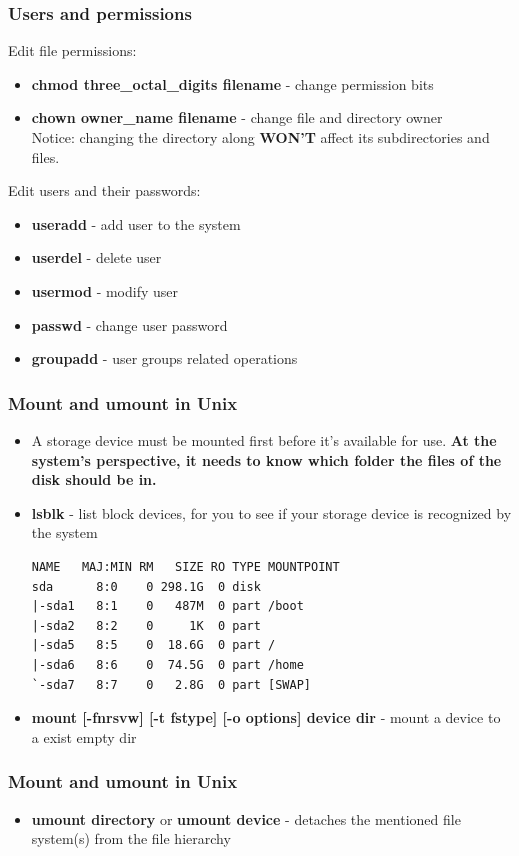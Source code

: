 \documentclass[11pt]{beamer}
\begin{document}
\begin{frame}
\frametitle{Users and permissions}
Edit file permissions:
\begin{itemize}
\item \textbf{chmod three\_octal\_digits filename} - change permission bits
\item \textbf{chown owner\_name filename} - change file and directory owner\\
Notice: changing the directory along \textbf{WON'T} affect its subdirectories and files.
\end{itemize}
Edit users and their passwords:
\begin{itemize}
\item \textbf{useradd} - add user to the system
\item \textbf{userdel} - delete user
\item \textbf{usermod} - modify user
\item \textbf{passwd} - change user password
\item \textbf{groupadd} - user groups related operations
\end{itemize}
\end{frame}



\begin{frame}[fragile]
\frametitle{Mount and umount in Unix}
\begin{itemize}
\item A storage device must be mounted first before it's available for use. \textbf{At the system's perspective, it needs to know which folder the files of the disk should be in.}
\item \textbf{lsblk} - list block devices, for you to see if your storage device is recognized by the system
\begin{verbatim}
NAME   MAJ:MIN RM   SIZE RO TYPE MOUNTPOINT
sda      8:0    0 298.1G  0 disk 
|-sda1   8:1    0   487M  0 part /boot
|-sda2   8:2    0     1K  0 part 
|-sda5   8:5    0  18.6G  0 part /
|-sda6   8:6    0  74.5G  0 part /home
`-sda7   8:7    0   2.8G  0 part [SWAP]
\end{verbatim}
\item \textbf{mount [-fnrsvw] [-t fstype] [-o options] device dir} - mount a device to a exist empty dir
\end{itemize}
\end{frame}

\begin{frame}
\frametitle{Mount and umount in Unix}
\begin{itemize}
\item \textbf{umount directory} or \textbf{umount device} - detaches the mentioned file system(s) from the file hierarchy
\end{itemize}
\end{frame}
\end{document}
